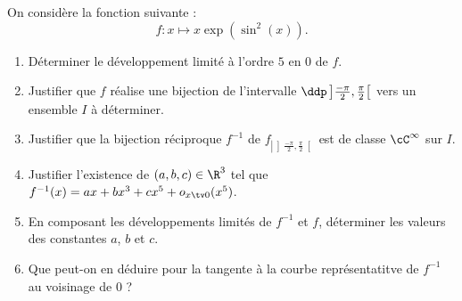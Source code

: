 


\begin{exercice}%
On considère la fonction suivante :
$$f : x\mapsto x\exp(\sin^2(x)).$$
\begin{enumerate}
\item Déterminer le développement limité à l'ordre $5$ en $0$ de $f$. 
\item Justifier que $f$ réalise une bijection de l'intervalle $\ddp \left] \frac{-\pi}{2},\frac{\pi}{2}\right[$ vers un ensemble $I$ à déterminer. 
\item Justifier que la bijection réciproque $f^{-1}$ de $f_{\left|{\left] \frac{-\pi}{2},\frac{\pi}{2}\right[}\right.}$ est de classe $\cC^\infty$ sur $I$. 
\item Justifier l'existence de $(a,b,c) \in \R^3$ tel que $f^{-1} (x) =ax+bx^3 +cx^5 +o_{x\tv 0} (x^5)$.
\item En composant les développements limités de $f^{-1}$ et $f$, déterminer les valeurs des constantes $a$, $b$ et $c$. 
\item Que peut-on en déduire pour la tangente à la courbe représentatitve de $f^{-1}$ au voisinage de $0$ ?
\end{enumerate}
\end{exercice}

